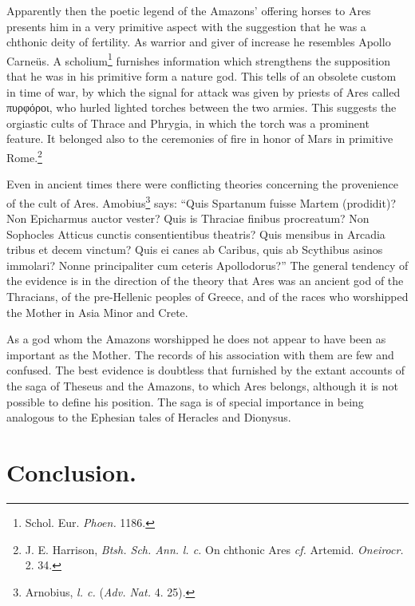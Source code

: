 \documentclass[a4paper, 12pt, oneside]{article}
\begin{document}
Apparently then the poetic legend of the Amazons' offering horses to Ares presents him in a very primitive aspect with the suggestion that he was a chthonic deity of fertility. As warrior and giver of increase he resembles Apollo Carneüs. A scholium\footnote{Schol. Eur. \emph{Phoen.} 1186.} furnishes information which strengthens the supposition that he was in his primitive form a nature god. This tells of an obsolete custom in time of war, by which the signal for attack was given by priests of Ares called πυρφόροι, who hurled lighted torches between the two armies. This suggests the orgiastic cults of Thrace and Phrygia, in which the torch was a prominent feature. It belonged also to the ceremonies of fire in honor of Mars in primitive Rome.\footnote{J. E. Harrison, \emph{Btsh. Sch. Ann.} \emph{l. c.} On chthonic Ares \emph{cf.} Artemid. \emph{Oneirocr.} 2. 34.}

Even in ancient times there were conflicting theories concerning the provenience of the cult of Ares. Amobius\footnote{Arnobius, \emph{l. c.} (\emph{Adv. Nat.} 4. 25).} says: ``Quis Spartanum fuisse Martem (prodidit)? Non Epicharmus auctor vester? Quis is Thraciae finibus procreatum? Non Sophocles Atticus cunctis consentientibus theatris? Quis mensibus in Arcadia tribus et decem vinctum? Quis ei canes ab Caribus, quis ab Scythibus asinos immolari? Nonne principaliter cum ceteris Apollodorus?'' The general tendency of the evidence is in the direction of the theory that Ares was an ancient god of the Thracians, of the pre-Hellenic peoples of Greece, and of the races who worshipped the Mother in Asia Minor and Crete.

As a god whom the Amazons worshipped he does not appear to have been as important as the Mother. The records of his association with them are few and confused. The best evidence is doubtless that furnished by the extant accounts of the saga of Theseus and the Amazons, to which Ares belongs, although it is not possible to define his position. The saga is of special importance in being analogous to the Ephesian tales of Heracles and Dionysus.
\clearpage
\section{Conclusion.}
\end{document}
